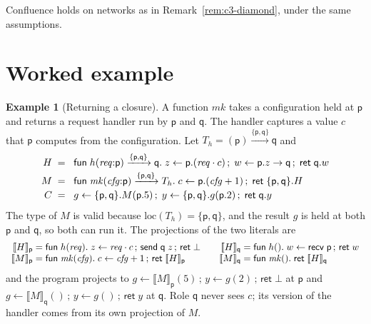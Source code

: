 \documentclass[11pt]{report}
\theoremstyle{plain}
\theoremstyle{definition}
\newtheorem{example}[theorem]{Example}
\theoremstyle{remark}
\newcommand{\kw}[1]{\mathsf{#1}}
\newcommand{\pp}{\mathsf{p}}
\newcommand{\qq}{\mathsf{q}}
\newcommand{\bind}[3]{#1 \leftarrow #2\,;\;#3}
\newcommand{\cret}[1]{\kw{ret}\;#1}
\newcommand{\com}[3]{#1.#2 \to #3}
\newcommand{\loc}[1]{\mathrm{loc}(#1)}
\newcommand{\nsend}[2]{\kw{send}\;#1\;#2}
\newcommand{\nrecv}[1]{\kw{recv}\;#1}
\newcommand{\nfun}[3]{\kw{fun}\;#1(#2).\;#3}
\newcommand{\proj}[2]{\llbracket #1 \rrbracket_{#2}}
\newcommand{\farr}[3]{(#1) \xrightarrow{#2} #3}
\newcommand{\cfun}[5]{\kw{fun}\;#1(#2) \xrightarrow{#3} #4.\;#5}
\begin{document}
Confluence holds on networks as in Remark~\ref{rem:c3-diamond},
under the same assumptions.

\section{Worked example}
\label{sec:c4-example}

\begin{example}[Returning a closure]\label{ex:c4-mk}
  A function $\mathit{mk}$ takes a configuration held at $\pp$ and returns a
  request handler run by $\pp$ and $\qq$.  The handler captures a value $c$
  that $\pp$ computes from the configuration.  Let
  $T_h=\farr{\pp}{\{\pp,\qq\}}{\qq}$ and
  \[
  \begin{array}{r@{\;\;}l}
    H \;=\; & \cfun{h}{\mathit{req}{:}\pp}{\{\pp,\qq\}}{\qq}{\bind{z}{\pp.(\mathit{req}\cdot c)}{\bind{w}{\com{\pp}{z}{\qq}}{\cret{\qq.w}}}}\\[0.5ex]
    M \;=\; & \cfun{\mathit{mk}}{\mathit{cfg}{:}\pp}{\{\pp,\qq\}}{T_h}{\bind{c}{\pp.(\mathit{cfg}+1)}{\cret{\{\pp,\qq\}.H}}}\\[0.5ex]
    C \;=\; & \bind{g}{\{\pp,\qq\}.M(\pp.5)}{\bind{y}{\{\pp,\qq\}.g(\pp.2)}{\cret{\qq.y}}}
  \end{array}
  \]
  The type of $M$ is valid because $\loc{T_h}=\{\pp,\qq\}$, and the result $g$
  is held at both $\pp$ and $\qq$, so both can run it.  The projections of
  the two literals are
  \[
  \begin{array}{r@{\;=\;}l@{\qquad}r@{\;=\;}l}
    \proj{H}{\pp} & \nfun{h}{\mathit{req}}{z\leftarrow\mathit{req}\cdot c\,;\,\nsend{\qq}{z}\,;\,\kw{ret}\;\bot} &
    \proj{H}{\qq} & \nfun{h}{}{w\leftarrow\nrecv{\pp}\,;\,\kw{ret}\;w}\\
    \proj{M}{\pp} & \nfun{\mathit{mk}}{\mathit{cfg}}{c\leftarrow\mathit{cfg}+1\,;\,\kw{ret}\;\proj{H}{\pp}} &
    \proj{M}{\qq} & \nfun{\mathit{mk}}{}{\kw{ret}\;\proj{H}{\qq}}
  \end{array}
  \]
  and the program projects to
  $g\leftarrow\proj{M}{\pp}(5)\,;\,y\leftarrow g(2)\,;\,\kw{ret}\;\bot$ at $\pp$
  and $g\leftarrow\proj{M}{\qq}()\,;\,y\leftarrow g()\,;\,\kw{ret}\;y$ at $\qq$.
  Role $\qq$ never sees $c$; its version of the handler comes from its own
  projection of $M$.


\end{example}
\end{document}
